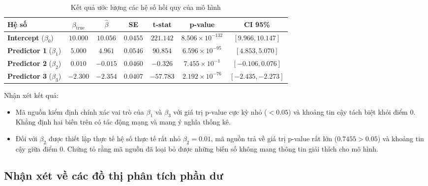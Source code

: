 \begin{table}[H]
    \centering
    \renewcommand{\arraystretch}{1.5}
    \setlength{\tabcolsep}{6pt} 

    \begin{tabular}{|p{4cm}|c|c|c|c|c|c|}
        \hline
        \rowcolor[rgb]{0.8, 0.9, 1.0}
        \textbf{Hệ số} & $\beta_{\text{true}}$ & $\hat{\beta}$ & \textbf{SE} & \textbf{t-stat} & \textbf{p-value} & \textbf{CI 95\%} \\ \hline
        
        \textbf{Intercept} ($\beta_0$) & $10.000$ & $10.056$ & $0.0455$ & $221.142$ & $8.506 \times 10^{-132}$ & $[9.966, 10.147]$ \\ \hline
        
        \textbf{Predictor 1} ($\beta_1$) & $5.000$ & $4.961$ & $0.0546$ & $90.854$ & $6.596 \times 10^{-95}$ & $[4.853, 5.070]$ \\ \hline
        
        \textbf{Predictor 2} ($\beta_2$) & $0.010$ & $-0.015$ & $0.0460$ & $-0.326$ & $7.455 \times 10^{-1}$ & $[-0.106, 0.076]$ \\ \hline
        
        \textbf{Predictor 3} ($\beta_3$) & $-2.300$ & $-2.354$ & $0.0407$ & $-57.783$ & $2.192 \times 10^{-76}$ & $[-2.435, -2.273]$ \\ \hline
    \end{tabular}
    \caption{Kết quả ước lượng các hệ số hồi quy của mô hình}
    \label{tab:regression_coefficients}
\end{table}

Nhận xét kết quả:

\begin{itemize}[topsep=0pt, itemsep=2.5pt, leftmargin=1.5cm]
    \item Mã nguồn kiểm định chính xác vai trò của $\beta_1$ và $\beta_3$ với giá trị p-value cực kỳ nhỏ ($ < 0.05$) và khoảng tin cậy tách biệt khỏi điểm 0. Khẳng định hai biến trên có tác động mạng và mang ý nghĩa thống kê.
    \item Đối với $\beta_2$ được thiết lập thực tế hệ số thực tế rất nhỏ $\beta_2 = 0.01$, mã nguồn trả về giá trị p-value rất lớn ($0.7455 > 0.05$) và khoảng tin cậy giữa điểm 0. Chứng tỏ rằng mã nguồn đã loại bỏ được những biến số không mang thông tin giải thích cho mô hình.
\end{itemize}

\subsection{Nhận xét về các đồ thị phân tích phần dư}

